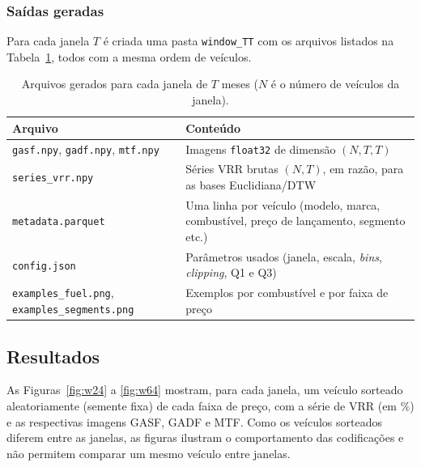 \subsubsection{Saídas geradas}

Para cada janela $T$ é criada uma pasta \texttt{window\_TT} com os arquivos listados na Tabela~\ref{tab:saidas}, todos com a mesma ordem de veículos.


\begin{table}[htbp]
\centering
\caption{Arquivos gerados para cada janela de $T$ meses ($N$ é o número de veículos da janela).}
\label{tab:saidas}
\begin{tabularx}{\columnwidth}{@{} l X @{}}
\toprule
\textbf{Arquivo} & \textbf{Conteúdo} \\
\midrule
\texttt{gasf.npy}, \texttt{gadf.npy}, \texttt{mtf.npy} & Imagens \texttt{float32} de dimensão $(N, T, T)$ \\ \addlinespace
\texttt{series\_vrr.npy} & Séries VRR brutas $(N, T)$, em razão, para as bases Euclidiana/DTW \\ \addlinespace
\texttt{metadata.parquet} & Uma linha por veículo (modelo, marca, combustível, preço de lançamento, segmento etc.) \\ \addlinespace
\texttt{config.json} & Parâmetros usados (janela, escala, \textit{bins}, \textit{clipping}, Q1 e Q3) \\ \addlinespace
\texttt{examples\_fuel.png}, \texttt{examples\_segments.png} & Exemplos por combustível e por faixa de preço \\
\bottomrule
\end{tabularx}
\end{table}

\subsection{Resultados}

As Figuras~\ref{fig:w24} a \ref{fig:w64} mostram, para cada janela, um veículo sorteado aleatoriamente (semente fixa) de cada faixa de preço, com a série de VRR (em \%) e as respectivas imagens GASF, GADF e MTF. Como os veículos sorteados diferem entre as janelas, as figuras ilustram o comportamento das codificações e não permitem comparar um mesmo veículo entre janelas.

